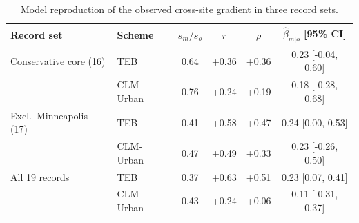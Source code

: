 \begin{table}[!tbp]
\centering\small
\caption{Model reproduction of the observed cross-site gradient in three record sets.}
\label{tab:modelvar}
\begin{tabular}{llcccc}
\toprule
Record set & Scheme & $s_m/s_o$ & $r$ & $\rho$ & $\hat\beta_{m|o}$ [95\% CI] \\
\midrule
Conservative core (16) & TEB & 0.64 & +0.36 & +0.36 & 0.23 [-0.04, 0.60] \\
 & CLM-Urban & 0.76 & +0.24 & +0.19 & 0.18 [-0.28, 0.68] \\
\addlinespace
Excl.\ Minneapolis (17) & TEB & 0.41 & +0.58 & +0.47 & 0.24 [0.00, 0.53] \\
 & CLM-Urban & 0.47 & +0.49 & +0.33 & 0.23 [-0.26, 0.50] \\
\addlinespace
All 19 records & TEB & 0.37 & +0.63 & +0.51 & 0.23 [0.07, 0.41] \\
 & CLM-Urban & 0.43 & +0.24 & +0.06 & 0.11 [-0.31, 0.37] \\
\bottomrule
\end{tabular}
\end{table}
